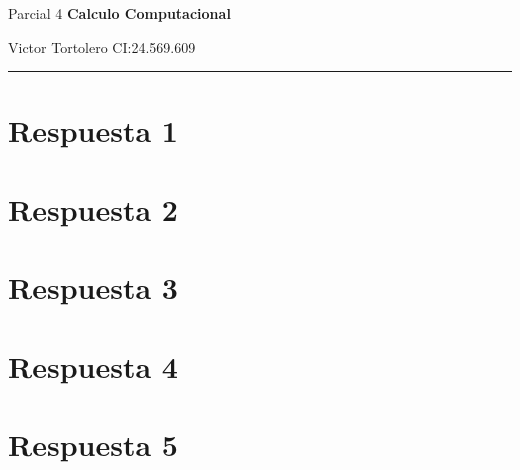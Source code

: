 \documentclass{article}
\begin{document}
\flushleft
\setlength{\parindent}{20pt}

\justify
\centerline{\huge Parcial 4 \textbf{Calculo Computacional}}
\centerline{Victor Tortolero CI:24.569.609}  %
\vspace{0.1cm}
\hrule

\section*{Respuesta 1}

\newpage

\section*{Respuesta 2}

\newpage

\section*{Respuesta 3}

\newpage

\section*{Respuesta 4}

\newpage

\section*{Respuesta 5}

\newpage
\end{document}
